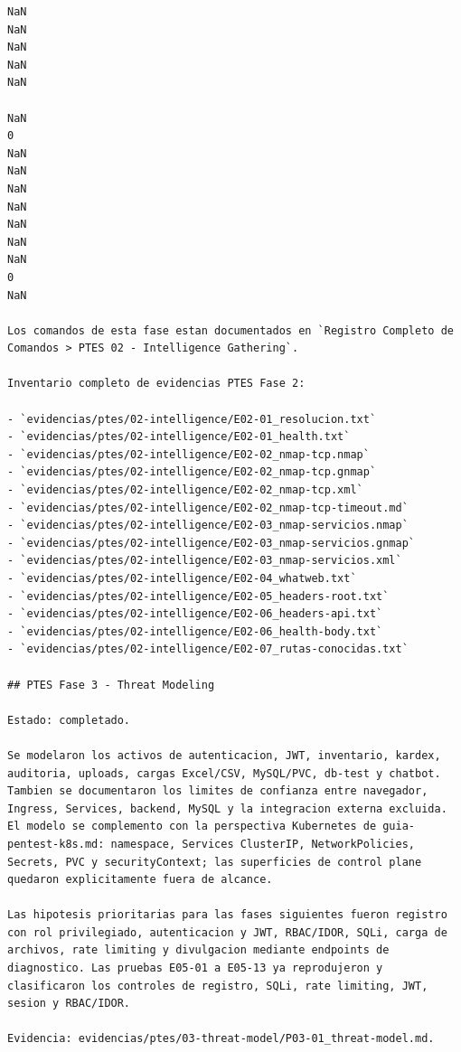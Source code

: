 \begin{tcolorbox}[codebox]
\begin{Verbatim}[fontsize=\scriptsize,breaklines=true,breakanywhere=true]
NaN
NaN
NaN
NaN
NaN

NaN
0
NaN
NaN
NaN
NaN
NaN
NaN
NaN
0
NaN

Los comandos de esta fase estan documentados en `Registro Completo de Comandos > PTES 02 - Intelligence Gathering`.

Inventario completo de evidencias PTES Fase 2:

- `evidencias/ptes/02-intelligence/E02-01_resolucion.txt`
- `evidencias/ptes/02-intelligence/E02-01_health.txt`
- `evidencias/ptes/02-intelligence/E02-02_nmap-tcp.nmap`
- `evidencias/ptes/02-intelligence/E02-02_nmap-tcp.gnmap`
- `evidencias/ptes/02-intelligence/E02-02_nmap-tcp.xml`
- `evidencias/ptes/02-intelligence/E02-02_nmap-tcp-timeout.md`
- `evidencias/ptes/02-intelligence/E02-03_nmap-servicios.nmap`
- `evidencias/ptes/02-intelligence/E02-03_nmap-servicios.gnmap`
- `evidencias/ptes/02-intelligence/E02-03_nmap-servicios.xml`
- `evidencias/ptes/02-intelligence/E02-04_whatweb.txt`
- `evidencias/ptes/02-intelligence/E02-05_headers-root.txt`
- `evidencias/ptes/02-intelligence/E02-06_headers-api.txt`
- `evidencias/ptes/02-intelligence/E02-06_health-body.txt`
- `evidencias/ptes/02-intelligence/E02-07_rutas-conocidas.txt`

## PTES Fase 3 - Threat Modeling

Estado: completado.

Se modelaron los activos de autenticacion, JWT, inventario, kardex, auditoria, uploads, cargas Excel/CSV, MySQL/PVC, db-test y chatbot. Tambien se documentaron los limites de confianza entre navegador, Ingress, Services, backend, MySQL y la integracion externa excluida. El modelo se complemento con la perspectiva Kubernetes de guia-pentest-k8s.md: namespace, Services ClusterIP, NetworkPolicies, Secrets, PVC y securityContext; las superficies de control plane quedaron explicitamente fuera de alcance.

Las hipotesis prioritarias para las fases siguientes fueron registro con rol privilegiado, autenticacion y JWT, RBAC/IDOR, SQLi, carga de archivos, rate limiting y divulgacion mediante endpoints de diagnostico. Las pruebas E05-01 a E05-13 ya reprodujeron y clasificaron los controles de registro, SQLi, rate limiting, JWT, sesion y RBAC/IDOR.

Evidencia: evidencias/ptes/03-threat-model/P03-01_threat-model.md.
\end{Verbatim}
\end{tcolorbox}
